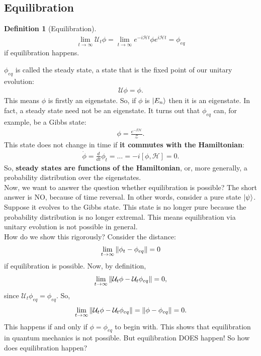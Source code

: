 \documentclass{book}
\theoremstyle{definition}
\newtheorem{defn}{Definition}[section]
\newcommand{\had}{\mathcal{H}}
\newcommand{\f}[2]{\frac{#1}{#2}}
\newcommand{\U}{\mathcal{U}}
\begin{document}
\subsection{Equilibration}

\begin{defn}[Equilibration]
	\begin{align}
	\lim_{t\to \infty}\U_t \phi = \lim_{t\to \infty} e^{-i\had t} \phi e^{i\had t} = \phi_{eq}
	\end{align}
	if equilibration happens. 
\end{defn}

$\phi_{eq}$ is called the steady state, a state that is the fixed point of our unitary evolution:
\begin{align}
\U \phi = \phi.
\end{align}
This means $\phi$ is firstly an eigenstate. So, if $\phi$ is $\ket{E_n}$ then it is an eigenstate. In fact, a steady state need not be an eigenstate. It turns out that $\phi_{eq}$ can, for example, be a Gibbs state:
\begin{align}
\phi = \f{e^{-\beta \had}}{\mathcal{Z}}.
\end{align}
This state does not change in time if \textbf{it commutes with the Hamiltonian}:
\begin{align}
\dot{\phi} = \f{d}{dt}\phi_t  =\dots =-i[\phi,\had] = 0.
\end{align}
So, \textbf{steady states are functions of the Hamiltonian}, or, more generally, a probability distribution over the eigenstates. \\

Now, we want to answer the question whether equilibration is possible? The short answer is NO, because of time reversal. In other words, consider a pure state $\ket{\psi}$. Suppose it evolves to the Gibbs state. This state is no longer pure because the probability distribution is no longer extremal. This means equilibration via unitary evolution is not possible in general. \\

How do we show this rigorously? Consider the distance: 
\begin{align}
\lim_{t\to \infty}\norm{\phi_t - \phi_{eq}} =0
\end{align}
if equilibration is possible. Now, by definition, 
\begin{align}
\lim_{t\to \infty}\norm{\U_t\phi - \U_t\phi_{eq}} =0,
\end{align}
since $\U_t \phi_{eq} = \phi_{eq}$. So, 
\begin{align}
\lim_{t\to \infty}\norm{\U_t\phi - \U_t\phi_{eq}} = \norm{\phi - \phi_{eq}} =0.
\end{align}
This happens if and only if $\phi = \phi_{eq}$ to begin with. This shows that equilibration in quantum mechanics is not possible. But equilibration DOES happen! So how does equilibration happen? \\
\end{document}
